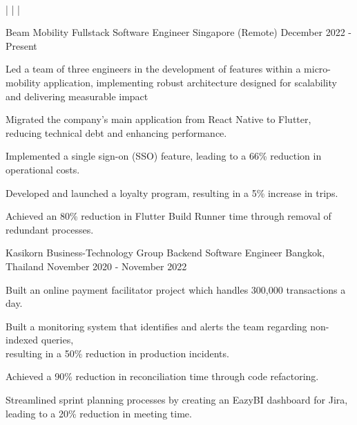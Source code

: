 \documentclass[]{awesome-cv}
\begin{document}
\begin{center}
	  \\
	\vspace{1mm}
	 |  |  | 
\end{center}
\begin{cventries}
	\cventry
	{Beam Mobility}
	{Fullstack Software Engineer}
	{Singapore (Remote)}
	{December 2022 - Present}
	{\begin{cvitems}
			\item {Led a team of three engineers in the development of features within a micro-mobility application, implementing robust architecture designed for scalability and delivering measurable impact}
			\item {Migrated the company's main application from React Native to Flutter,\\ reducing technical debt and enhancing performance.}
			\item {Implemented a single sign-on (SSO) feature, leading to a 66\% reduction in operational costs.}
			\item {Developed and launched a loyalty program, resulting in a 5\% increase in trips.}
			\item {Achieved an 80\% reduction in Flutter Build Runner time through removal of redundant processes.}
		\end{cvitems}}
	\cventry
	{Kasikorn Business-Technology Group}
	{Backend Software Engineer}
	{Bangkok, Thailand}
	{November 2020 - November 2022}
	{\begin{cvitems}
			\item {Built an online payment facilitator project which handles 300,000 transactions a day.}
			\item {Built a monitoring system that identifies and alerts the team regarding non-indexed queries,\\ resulting in a 50\% reduction in production incidents.}
			\item {Achieved a 90\% reduction in reconciliation time through code refactoring.}
			\item {Streamlined sprint planning processes by creating an EazyBI dashboard for Jira,\\ leading to a 20\% reduction in meeting time.}

\end{cvitems}}
\end{cventries}
\end{document}
